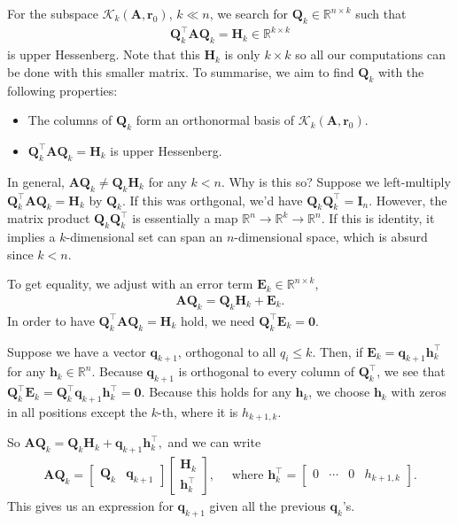 \documentclass[12pt,a4paper]{article} %
\begin{document}
For the subspace $\mathcal K_k (\mathbf A, \bm r_0)$, $k \ll n$, 
we search for $\mathbf Q_k \in \mathbb R^{n \times k}$ such that 
\begin{align*}
    \mathbf Q_k^\top \mathbf A \mathbf Q_k = \mathbf H_k \in \mathbb R^{k \times k}
\end{align*}
is upper Hessenberg. Note that this $\mathbf H_k$ is only $k \times k$ so 
all our computations can be done with this smaller matrix. To summarise, 
we aim to find $\mathbf Q_k$ with the following properties:
\begin{itemize}
    \item The columns  of $\mathbf Q_k$ form an orthonormal basis of $\mathcal K_k (\mathbf A, \bm r_0)$.
    \item $\mathbf Q_k^\top \mathbf A \mathbf Q_k = \mathbf H_k$ is upper Hessenberg.
\end{itemize}
In general, $\mathbf A \mathbf Q_k \ne \mathbf Q_k \mathbf H_k$ for any $k < n$.
Why is this so? Suppose we left-multiply $\mathbf Q_k^\top \mathbf A \mathbf Q_k = \mathbf H_k$
 by $\mathbf Q_k$. 
If this was orthgonal, we'd have $\mathbf Q_k \mathbf Q_k^\top = \mathbf I_n$.
However, the matrix product  $\mathbf Q_k \mathbf Q_k^\top$ is essentially 
a map $\mathbb R^n \to \mathbb R^k \to \mathbb R^n$. If this is identity, 
it implies a $k$-dimensional set can span an $n$-dimensional space, 
which is absurd since $k < n$.

To get equality, we adjust with an error term $\mathbf E_k \in \mathbb R^{n \times k}$,
\begin{align*}
    \mathbf A \mathbf Q_k = \mathbf Q_k \mathbf H_k + \mathbf E_k.
\end{align*}
In order to have $\mathbf Q_k^\top \mathbf A \mathbf Q_k = \mathbf H_k$ 
hold, we need $\mathbf Q_k^\top \mathbf E_k = \mathbf 0$.

Suppose we have a vector $\bm q_{k+1}$, orthogonal to all $q_i \le k$.
Then, if $\mathbf E_k = \bm q_{k+1} \bm h^\top_{k}$ for any $\bm h_k \in \mathbb R^n$. 
Because $\bm q_{k+1}$ is orthogonal to every column of $\mathbf Q_k^\top$, we 
see that $\mathbf Q_k^\top \mathbf E_k = \mathbf Q_k^\top \bm q_{k+1} \bm h^\top_{k} = \mathbf 0$. 
Because this holds for any $\bm h_k$, we choose $\bm h_k$ with zeros in all positions 
except the $k$-th, where it is $h_{k+1,k}$.

So $\mathbf{A} \mathbf{Q}_{k}=\mathbf{Q}_{k} \mathbf{H}_{k}+\bm{q}_{k+1} \bm{h}_{k}^{\top},$ and we can write
\begin{align*}
    \mathbf{A} \mathbf{Q}_{k}=
    \begin{bmatrix}
        \mathbf Q_k & \bm q_{k+1}
    \end{bmatrix}
    \begin{bmatrix}\mathbf{H}_{k} \\[0.8em] \bm{h}_{k}^{\top}\end{bmatrix}, 
        \quad \text { where }\bm{h}_{k}^\top= \begin{bmatrix}
            0 & \cdots & 0 & h_{k+1,k}
        \end{bmatrix}.
\end{align*}
This gives us an expression for $\bm q_{k+1}$ given all the previous $\bm q_k$'s.
\end{document}
